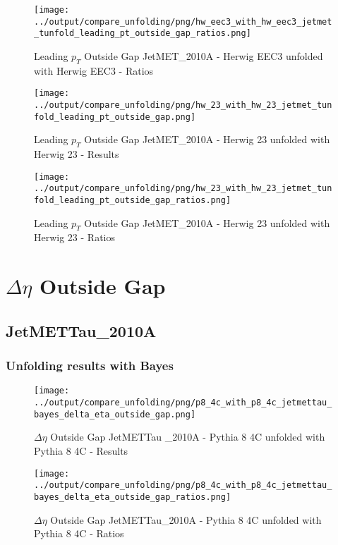 \documentclass[11pt]{book}
\begin{document}
\begin{figure}[ht]
\centering
\texttt{[image: ../output/compare\_unfolding/png/hw\_eec3\_with\_hw\_eec3\_jetmet\_tunfold\_leading\_pt\_outside\_gap\_ratios.png]}
\caption{Leading $p_{T}$ Outside Gap JetMET\_2010A - Herwig EEC3 unfolded with Herwig EEC3 - Ratios}
\label{hw_eec3_hw_eec3_jetmet_tunfold_leading_pt_outside_gap_b}
\end{figure}

\begin{figure}[ht]
\centering
\texttt{[image: ../output/compare\_unfolding/png/hw\_23\_with\_hw\_23\_jetmet\_tunfold\_leading\_pt\_outside\_gap.png]}
\caption{Leading $p_{T}$ Outside Gap JetMET\_2010A - Herwig 23 unfolded with Herwig 23 - Results}
\label{hw_23_hw_23_jetmet_tunfold_leading_pt_outside_gap_a}
\end{figure}

\begin{figure}[ht]
\centering
\texttt{[image: ../output/compare\_unfolding/png/hw\_23\_with\_hw\_23\_jetmet\_tunfold\_leading\_pt\_outside\_gap\_ratios.png]}
\caption{Leading $p_{T}$ Outside Gap JetMET\_2010A - Herwig 23 unfolded with Herwig 23 - Ratios}
\label{hw_23_hw_23_jetmet_tunfold_leading_pt_outside_gap_b}
\end{figure}


\cleardoublepage
\chapter{$\Delta\eta$ Outside Gap}
\section{JetMETTau\_2010A}
\subsection{Unfolding results with Bayes}


\begin{figure}[ht]
\centering
\texttt{[image: ../output/compare\_unfolding/png/p8\_4c\_with\_p8\_4c\_jetmettau\_bayes\_delta\_eta\_outside\_gap.png]}
\caption{$\Delta\eta$ Outside Gap JetMETTau \_2010A - Pythia 8 4C unfolded with Pythia 8 4C - Results}
\label{p8_p8_jetmettau_bayes_delta_eta_outside_gap_a}
\end{figure}

\begin{figure}[ht]
\centering
\texttt{[image: ../output/compare\_unfolding/png/p8\_4c\_with\_p8\_4c\_jetmettau\_bayes\_delta\_eta\_outside\_gap\_ratios.png]}
\caption{$\Delta\eta$ Outside Gap JetMETTau\_2010A - Pythia 8 4C unfolded with Pythia 8 4C - Ratios}
\label{p8_p8_jetmettau_bayes_delta_eta_outside_gap_b}
\end{figure}
\end{document}
